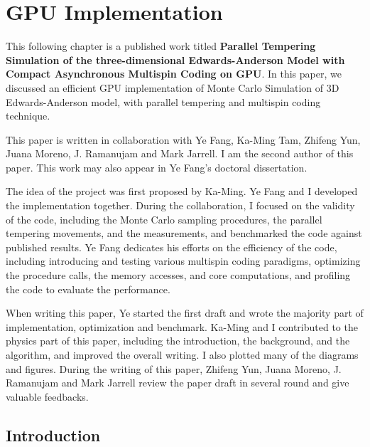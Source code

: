 \chapter{GPU Implementation}
\label{chap:SG_imp}
This following chapter is a published work titled {\bf Parallel Tempering 
Simulation of the three-dimensional Edwards-Anderson Model  with  Compact 
Asynchronous Multispin Coding on GPU}.
In this paper, we discussed an efficient GPU implementation of Monte Carlo 
Simulation of 3D Edwards-Anderson model, with parallel tempering and multispin 
coding technique. 

This paper is written in collaboration with Ye Fang, Ka-Ming Tam, Zhifeng Yun, 
Juana Moreno, J. Ramanujam and Mark Jarrell. I am the second author of this 
paper.  This work may also appear in Ye Fang's doctoral dissertation. 

The idea of the project was first proposed by Ka-Ming. 
Ye Fang and I developed the implementation together. 
During the collaboration, I focused on the validity of the code, including the 
Monte Carlo sampling procedures, the parallel tempering movements, and the 
measurements, and benchmarked the code against published results. 
Ye Fang dedicates his efforts on the efficiency of the code, including 
introducing and testing various multispin coding paradigms, optimizing the 
procedure calls, the memory accesses, and core computations, and profiling the 
code to evaluate the performance. 

When writing this paper, Ye started the first draft and wrote the majority part 
of implementation, optimization and benchmark. 
Ka-Ming and I contributed to the physics part of this paper, including the 
introduction, the background, and the algorithm, and improved the overall writing. 
I also plotted many of the diagrams and figures.
During the writing of this paper, Zhifeng Yun, Juana Moreno, J. Ramanujam and 
Mark Jarrell  review the paper draft in several round and give valuable 
feedbacks.


\section{Introduction}

